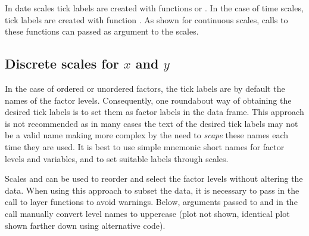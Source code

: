 \documentclass[krantz2]{krantz}\usepackage{knitr}
\begin{document}
In date scales tick labels are created with functions  or . In the case of time scales, tick labels are created with function . As shown for continuous scales, calls to these functions can passed as argument to the scales.


\subsection{Discrete scales for $x$ and $y$}

In the case of ordered or unordered factors, the tick labels are by default the names of the factor levels. Consequently, one roundabout way of obtaining the desired tick labels is to set them as factor labels in the data frame. This approach is not recommended as in many cases the text of the desired tick labels may not be a valid \Rlang name making more complex by the need to \emph{scape} these names each time they are used. It is best to use simple mnemonic short names for factor levels and variables, and to set suitable labels through scales.

Scales  and  can be used to reorder and select the factor levels without altering the data. When using this approach to subset the data, it is necessary to pass  in the call to layer functions to avoid warnings. Below, arguments passed to  and  in the call  manually convert level names to uppercase (plot not shown, identical plot shown farther down using alternative code).


\begin{knitrout}\footnotesize
{}\color{fgcolor}\begin{kframe}
\begin{alltt}
\hlstd{(} 
        \hlstd{=} \hlstd{(}    \hlopt{+}
  \hlstd{(} \hlstd{=} \hlstd{,}    \hlstd{=} \hlstd{)} \hlopt{+}
  \hlstd{(} \hlstd{=} \hlstd{(}\hlstd{,} \hlstd{,} \hlstd{),}
                    \hlstd{=} \hlstd{(}\hlstd{,} \hlstd{,} \hlstd{))}
\end{alltt}
\end{kframe}
\end{knitrout}
\end{document}
